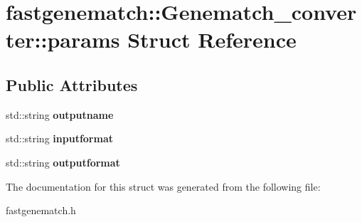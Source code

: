 \hypertarget{structfastgenematch_1_1Genematch__converter_1_1params}{
\section{fastgenematch::Genematch\_\-converter::params Struct Reference}
\label{structfastgenematch_1_1Genematch__converter_1_1params}
}
\subsection*{Public Attributes}
\begin{DoxyCompactItemize}
\item 
\hypertarget{structfastgenematch_1_1Genematch__converter_1_1params_a7e1e7c2de3616fcb90c7581b6063c7e7}{
std::string {\bfseries outputname}}
\label{structfastgenematch_1_1Genematch__converter_1_1params_a7e1e7c2de3616fcb90c7581b6063c7e7}

\item 
\hypertarget{structfastgenematch_1_1Genematch__converter_1_1params_a86f639bede2c1b30e26d01fa3af49abc}{
std::string {\bfseries inputformat}}
\label{structfastgenematch_1_1Genematch__converter_1_1params_a86f639bede2c1b30e26d01fa3af49abc}

\item 
\hypertarget{structfastgenematch_1_1Genematch__converter_1_1params_afbfff345aab934eda4c4760cfb6ab453}{
std::string {\bfseries outputformat}}
\label{structfastgenematch_1_1Genematch__converter_1_1params_afbfff345aab934eda4c4760cfb6ab453}

\end{DoxyCompactItemize}


The documentation for this struct was generated from the following file:\begin{DoxyCompactItemize}
\item 
fastgenematch.h\end{DoxyCompactItemize}
